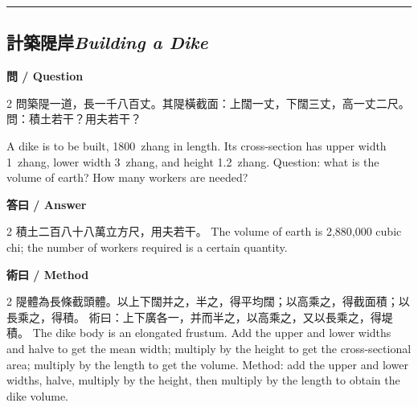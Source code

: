 \documentclass[11pt,a4paper]{article}
\newcommand{\bilingualsubsection}[2]{\subsection{#1\quad\textit{#2}}}
\newcommand{\longline}{\noindent\rule{\textwidth}{0.4pt}}
\begin{document}
\vspace{0.5em}
\longline

\bilingualsubsection{計築隄岸}{Building a Dike}

\vspace{0.4em}
\noindent\textbf{\textcolor{chinesecolor}{問} / \textcolor{englishcolor}{Question}}
\vspace{0.3em}
\begin{paracol}{2}
問築隄一道，長一千八百丈。其隄橫截面：上闊一丈，下闊三丈，高一丈二尺。
問：積土若干？用夫若干？
\switchcolumn

A dike is to be built, 1800~zhang in length. Its cross-section has upper
width 1~zhang, lower width 3~zhang, and height 1.2~zhang. Question: what is
the volume of earth? How many workers are needed?

\end{paracol}

\vspace{0.4em}
\noindent\textbf{\textcolor{chinesecolor}{答曰} / \textcolor{englishcolor}{Answer}}
\vspace{0.2em}
\begin{paracol}{2}
積土二百八十八萬立方尺，用夫若干。
\switchcolumn
The volume of earth is 2,880,000 cubic chi; the number of workers required
is a certain quantity.
\end{paracol}

\vspace{0.4em}
\noindent\textbf{\textcolor{chinesecolor}{術曰} / \textcolor{englishcolor}{Method}}
\vspace{0.2em}
\begin{paracol}{2}
隄體為長條截頭體。以上下闊并之，半之，得平均闊；以高乘之，得截面積；以長乘之，得積。
術曰：上下廣各一，并而半之，以高乘之，又以長乘之，得堤積。
\switchcolumn
The dike body is an elongated frustum. Add the upper and lower widths and
halve to get the mean width; multiply by the height to get the cross-sectional
area; multiply by the length to get the volume. Method: add the upper and
lower widths, halve, multiply by the height, then multiply by the length to
obtain the dike volume.
\end{paracol}
\end{document}
